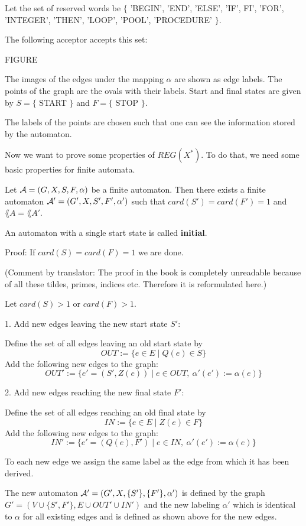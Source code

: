 Let the set of reserved words be 
$\{$ 'BEGIN', 'END', 'ELSE', 'IF', FI', 'FOR', 'INTEGER', 'THEN', 'LOOP',
'POOL', 'PROCEDURE' $\}$.

The following acceptor accepts this set:

FIGURE

The images of the edges under the mapping $\alpha$ are shown as edge labels. The
points of the graph are the ovals with their labels. Start and final states are
given by $S = \{$ START $\}$ and $F = \{$ STOP $\}$.

The labels of the points are chosen such that one can see the information stored
by the automaton.

Now we want to prove some properties of $REG(X^*)$. To do that, we need
some basic properties for finite automata.

\begin{lemma}
Let $\mbox{$\mathcal{A}$} = (G, X, S, F, \alpha)$ be a finite automaton. Then there
exists a finite automaton $\mbox{$\mathcal{A'}$} = (G', X, S', F', \alpha')$ such that
$card(S') = card(F') = 1$ and $\lang{A} = \lang{A'}$.
\end{lemma}

An automaton with a single start state is called {\bf initial}.

Proof: If $card(S) = card(F) = 1$ we are done.

(Comment by translator: The proof in the book is completely unreadable because
of all these tildes, primes, indices etc. Therefore it is reformulated here.) 

Let $card(S) > 1$ or $card(F) > 1$.

1. Add new edges leaving the new start state $S'$:

Define the set of all edges leaving an old start state by
\[ OUT := \{ e \in E \mid Q(e) \in S \} \]
Add the following new edges to the graph:
\[ OUT' := \{ e' = (S', Z(e)) \mid e \in OUT,\ \alpha'(e') := \alpha(e) \} \]

2. Add new edges reaching the new final state $F'$:

Define the set of all edges reaching an old final state by
\[ IN := \{ e \in E \mid Z(e) \in F \} \]
Add the following new edges to the graph:
\[ IN' := \{ e' = (Q(e), F') \mid e \in IN,\ \alpha'(e') := \alpha(e) \} \]

To each new edge we assign the same label as the edge from which it has been
derived.

The new automaton $\mbox{$\mathcal{A'}$} = (G', X, \{S'\}, \{F'\}, \alpha')$ is defined
by the graph $G' = (V \cup \{ S', F' \}, E \cup OUT' \cup IN')$
and the new labeling $\alpha'$ which is identical to $\alpha$ for all existing edges and is defined as shown above for the new edges.

